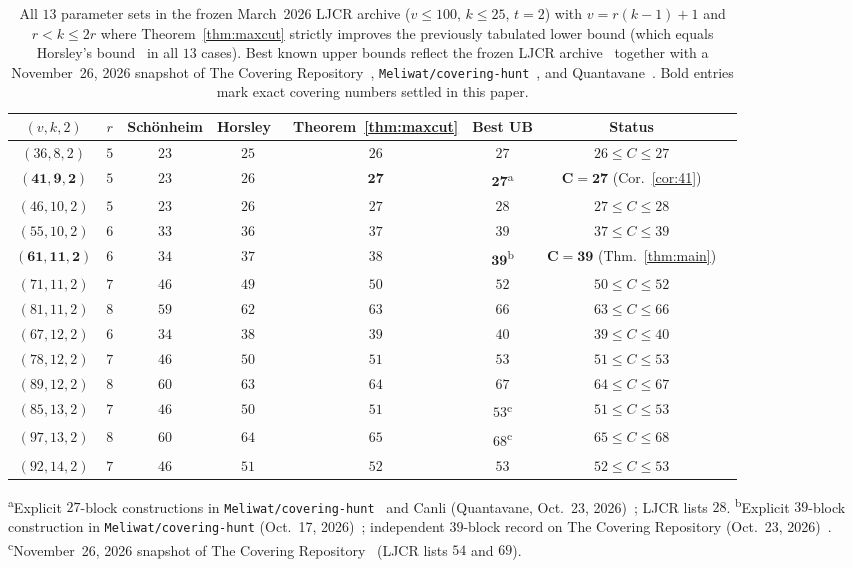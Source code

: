 \documentclass[11pt,a4paper]{article}
\theoremstyle{definition}
\theoremstyle{remark}
\begin{document}
\begin{table}[t]
\centering
\caption{All $13$ parameter sets in the frozen March~2026 LJCR archive ($v \le 100$, $k \le 25$, $t=2$) with $v = r(k-1)+1$ and $r < k \le 2r$ where Theorem~\ref{thm:maxcut} strictly improves the previously tabulated lower bound (which equals Horsley's bound~\cite[Theorem~4(a)]{Horsley2017} in all $13$ cases). Best known upper bounds reflect the frozen LJCR archive~\cite{GordonLJCR} together with a November~26, 2026 snapshot of The Covering Repository~\cite{AcerbiCR}, \texttt{Meliwat/covering-hunt}~\cite{Meliwat2026}, and Quantavane~\cite{Canli2026}. Bold entries mark exact covering numbers settled in this paper.}
\label{tab:maxcut}
\small
\begin{tabular}{@{}cccccccc@{}}
\toprule
$(v,k,2)$ & $r$ & Sch\"onheim & Horsley~\cite{Horsley2017} & Theorem~\ref{thm:maxcut} & Best UB & Status \\
\midrule
$(36,8,2)$  & $5$ & $23$ & $25$ & $26$ & $27$ & $26 \le C \le 27$ \\
$\mathbf{(41,9,2)}$  & $5$ & $23$ & $26$ & $\mathbf{27}$ & $\mathbf{27}$\textsuperscript{a} & $\mathbf{C = 27}$ (Cor.~\ref{cor:41}) \\
$(46,10,2)$ & $5$ & $23$ & $26$ & $27$ & $28$ & $27 \le C \le 28$ \\
$(55,10,2)$ & $6$ & $33$ & $36$ & $37$ & $39$ & $37 \le C \le 39$ \\
$\mathbf{(61,11,2)}$ & $6$ & $34$ & $37$ & $38$ & $\mathbf{39}$\textsuperscript{b} & $\mathbf{C = 39}$ (Thm.~\ref{thm:main}) \\
$(71,11,2)$ & $7$ & $46$ & $49$ & $50$ & $52$ & $50 \le C \le 52$ \\
$(81,11,2)$ & $8$ & $59$ & $62$ & $63$ & $66$ & $63 \le C \le 66$ \\
$(67,12,2)$ & $6$ & $34$ & $38$ & $39$ & $40$ & $39 \le C \le 40$ \\
$(78,12,2)$ & $7$ & $46$ & $50$ & $51$ & $53$ & $51 \le C \le 53$ \\
$(89,12,2)$ & $8$ & $60$ & $63$ & $64$ & $67$ & $64 \le C \le 67$ \\
$(85,13,2)$ & $7$ & $46$ & $50$ & $51$ & $53$\textsuperscript{c} & $51 \le C \le 53$ \\
$(97,13,2)$ & $8$ & $60$ & $64$ & $65$ & $68$\textsuperscript{c} & $65 \le C \le 68$ \\
$(92,14,2)$ & $7$ & $46$ & $51$ & $52$ & $53$ & $52 \le C \le 53$ \\
\bottomrule
\end{tabular}
\par\smallskip
\footnotesize
\textsuperscript{a}Explicit $27$-block constructions in \texttt{Meliwat/covering-hunt}~\cite{Meliwat2026} and Canli (Quantavane, Oct.~23, 2026)~\cite{Canli2026}; LJCR lists $28$.
\textsuperscript{b}Explicit $39$-block construction in \texttt{Meliwat/covering-hunt} (Oct.~17, 2026)~\cite{Meliwat2026}; independent $39$-block record on The Covering Repository (Oct.~23, 2026)~\cite{AcerbiCR}.
\textsuperscript{c}November~26, 2026 snapshot of The Covering Repository~\cite{AcerbiCR} (LJCR lists $54$ and $69$).
\end{table}
\end{document}
